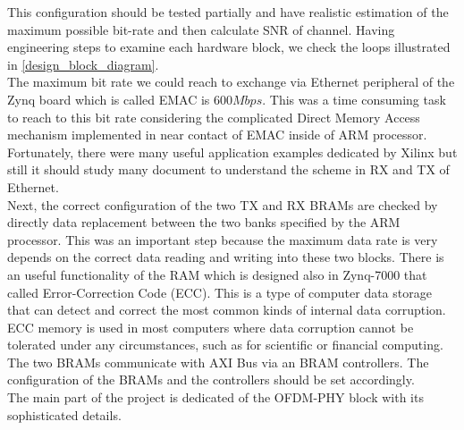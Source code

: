 This configuration should be tested partially and have realistic estimation of the maximum possible bit-rate and then calculate SNR of channel. Having engineering steps to examine each hardware block, we check the loops illustrated in \ref{design_block_diagram}.\\
The maximum bit rate we could reach to exchange via Ethernet peripheral of the Zynq board which is called EMAC is $600 Mbps$. This was a time consuming task to reach to this bit rate considering the complicated Direct Memory Access mechanism implemented in near contact of EMAC inside of ARM processor. Fortunately, there were many useful application examples dedicated by Xilinx but still it should study many document to understand the scheme in RX and TX of Ethernet.\\
Next, the correct configuration of the two TX and RX BRAMs are checked by directly data replacement between the two banks specified by the ARM processor. This was an important step because the maximum data rate is very depends on the correct data reading and writing into these two blocks. There is an useful functionality of the RAM which is designed also in Zynq-7000 that called Error-Correction Code (ECC). This is a type of computer data storage that can detect and correct the most common kinds of internal data corruption. ECC memory is used in most computers where data corruption cannot be tolerated under any circumstances, such as for scientific or financial computing. The two BRAMs communicate with AXI Bus via an BRAM controllers. The configuration of the BRAMs and the controllers should be set accordingly.\\
The main part of the project is dedicated of the OFDM-PHY block with its sophisticated details.\\



